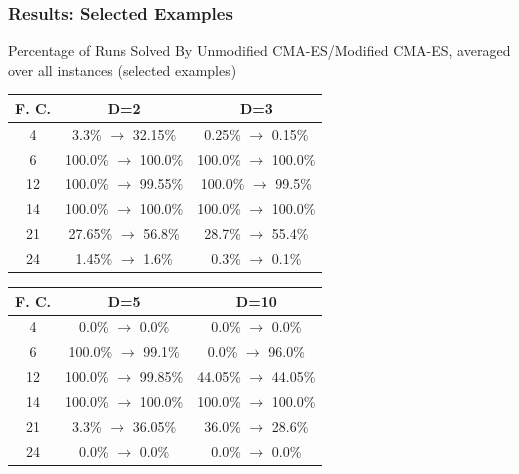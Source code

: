\documentclass{beamer}
\begin{document}
	\begin{frame}
		\frametitle{Results: Selected Examples}
		\begin{table}
			\centering
			Percentage of Runs Solved By Unmodified CMA-ES/Modified CMA-ES, averaged over all instances (selected examples)
			\label{tab:experiment3Results}
			\small
			\begin{tabular}{c|c|c}
				\hline
				F. C. & D=2 & D=3\\
				\hline
				\hline
				4 &  3.3\% $\rightarrow$ 32.15\%  &  0.25\% $\rightarrow$ 0.15\% \\
				\hline	
				6 &  100.0\% $\rightarrow$ 100.0\%  &  100.0\% $\rightarrow$ 100.0\%  \\
				\hline					
				12 &  100.0\% $\rightarrow$ 99.55\%  &  100.0\% $\rightarrow$ 99.5\%  \\
				\hline
				14 &  100.0\% $\rightarrow$ 100.0\%  &  100.0\% $\rightarrow$ 100.0\%   \\
				\hline				
				21 &  27.65\% $\rightarrow$ 56.8\%  &  28.7\% $\rightarrow$ 55.4\%  \\
				\hline
				24 &  1.45\% $\rightarrow$ 1.6\%  &  0.3\% $\rightarrow$ 0.1\%  \\
				
				\hline
			\end{tabular}
		\end{table}
		\begin{table}
	\small
	\begin{tabular}{c|c|c}
		\hline
		F. C. & D=5 & D=10\\
		\hline
		\hline
		4 &  0.0\% $\rightarrow$ 0.0\%  &  0.0\% $\rightarrow$ 0.0\% \\
		\hline	
		6 & 100.0\% $\rightarrow$ 99.1\%  &  0.0\% $\rightarrow$ 96.0\% \\
		\hline					
		12  &  100.0\% $\rightarrow$ 99.85\%  &  44.05\% $\rightarrow$ 44.05\% \\
		\hline
		14 &  100.0\% $\rightarrow$ 100.0\%  &  100.0\% $\rightarrow$ 100.0\% \\
		\hline				
		21 &  3.3\% $\rightarrow$ 36.05\%  &  36.0\% $\rightarrow$ 28.6\% \\
		\hline
		24 & 0.0\% $\rightarrow$ 0.0\%  &  0.0\% $\rightarrow$ 0.0\% \\
		
		\hline
	\end{tabular}
\end{table}	
	
	\end{frame}
	
\end{document}
